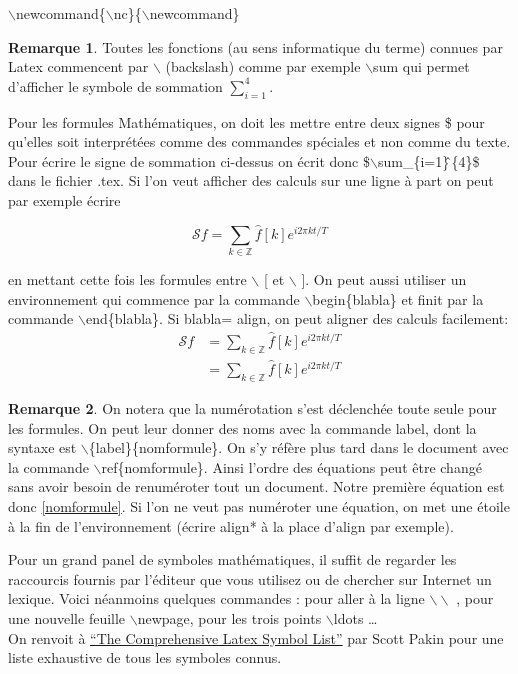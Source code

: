 \documentclass[11pt]{article}
\theoremstyle{remark}
\theoremstyle{definition}
\newtheorem{rem}{Remarque}[section]
\begin{document}
$\backslash$newcommand\{$\backslash$nc\}\{$\backslash$newcommand\}

\begin{rem}
 Toutes les fonctions (au sens informatique du terme) connues par Latex commencent par $\backslash$ (backslash) comme par exemple $\backslash$sum qui permet d'afficher le symbole de sommation $\sum_{i=1}^{4}$.
\end{rem}


Pour les formules Mathématiques, on doit  les mettre entre deux signes \$ pour qu'elles soit interprétées comme des commandes spéciales et non comme du texte. Pour écrire le signe de sommation ci-dessus on écrit donc \$$\backslash$sum\_\{i=1\}\^ \,\{4\}\$ dans le fichier .tex. Si l'on veut afficher des calculs sur une ligne à part on peut par exemple écrire

\[\mathcal{S}f = \sum_{k\in\mathbb{Z}} \hat f[k] e^{i2\pi kt/T} \]

en mettant cette fois les formules  entre  $\backslash$ [ et $\backslash$ ]. On peut aussi utiliser un environnement qui commence par la commande $\backslash$begin\{blabla\} et finit par la commande $\backslash$end\{blabla\}. Si blabla= align, on peut aligner des calculs facilement:
\begin{align}
 \mathcal{S}f & = \sum_{k\in\mathbb{Z}} \hat f[k] e^{i2\pi kt/T} \label{nomformule}\\
  & = \sum_{k\in\mathbb{Z}} \hat f[k] e^{i2\pi kt/T}
\end{align}

\begin{rem}
On notera que la numérotation s'est déclenchée toute seule pour les formules. On peut  leur donner des noms avec la commande label,  dont la syntaxe est  $\backslash$\{label\}\{nomformule\}.
On s'y réfère plus tard dans le document  avec la commande $\backslash$ref\{nomformule\}. Ainsi l'ordre des équations peut être changé sans avoir besoin de renuméroter tout un document. Notre première équation est donc \ref{nomformule}. Si l'on ne veut pas numéroter une équation,  on met une étoile à la fin de l'environnement (écrire align* à la place d'align par exemple).
\end{rem}



Pour un grand panel de symboles mathématiques, il suffit de regarder les raccourcis fournis par l'éditeur que vous utilisez ou de chercher sur Internet un lexique. Voici néanmoins quelques commandes : pour aller à la ligne  $\backslash\backslash$ , pour une nouvelle feuille $\backslash$newpage, pour les trois points  $\backslash$ldots \ldots \medskip
\\
On renvoit à \href{http://www.ctan.org/get/info/symbols/comprehensive/symbols-a4.pdf}{``The Comprehensive Latex Symbol List''} par Scott Pakin pour une liste exhaustive de tous les symboles connus.
\end{document}
